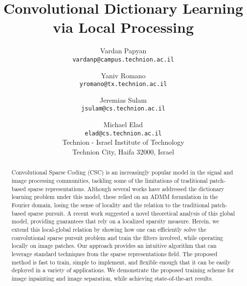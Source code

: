 \documentclass[10pt,twocolumn,letterpaper]{article}
\begin{document}
\title{Convolutional Dictionary Learning via Local Processing}

\author{
Vardan Papyan\\
{\tt\small vardanp@campus.technion.ac.il}
\and
Yaniv Romano\\
{\tt\small yromano@tx.technion.ac.il}
\and
Jeremias Sulam\\
{\tt\small jsulam@cs.technion.ac.il}
\and
Michael Elad\\
{\tt\small elad@cs.technion.ac.il}\\
Technion - Israel Institute of Technology\\
Technion City, Haifa 32000, Israel\\
}

\maketitle

\begin{abstract}
Convolutional Sparse Coding (CSC) is an increasingly popular model in the signal and image processing communities, tackling some of the limitations of traditional patch-based sparse representations. Although several works have addressed the dictionary learning problem under this model, these relied on an ADMM formulation in the Fourier domain, losing the sense of locality and the relation to the traditional patch-based sparse pursuit. A recent work suggested a novel theoretical analysis of this global model, providing guarantees that rely on a localized sparsity measure. Herein, we extend this local-global relation by showing how one can efficiently solve the convolutional sparse pursuit problem and train the filters involved, while operating locally on image patches. Our approach provides an intuitive algorithm that can leverage standard techniques from the sparse representations field. The proposed method is fast to train, simple to implement, and flexible enough that it can be easily deployed in a variety of applications. We demonstrate the proposed training scheme for image inpainting and image separation, while achieving state-of-the-art results.
\end{abstract}

\end{document}
